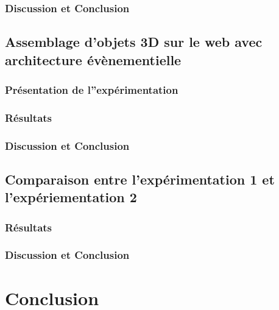 \documentclass[final,10pt,doubleside]{book}
\begin{document}
	\subsection{Discussion et Conclusion}
	
\section{Assemblage d'objets 3D sur le web avec architecture évènementielle}
	\subsection{Présentation de l''expérimentation}
	\subsection{Résultats}
	\subsection{Discussion et Conclusion}
	
	\section{Comparaison entre l'expérimentation 1 et l'expériementation 2}
		\subsection{Résultats}
		\subsection{Discussion et Conclusion}
	
\chapter{Conclusion}
\end{document}
